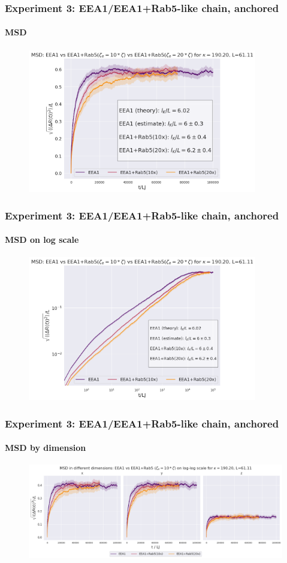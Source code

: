 \documentclass[handout]{beamer}
\begin{document}
\begin{frame}
    \frametitle{Experiment 3: EEA1/EEA1+Rab5-like chain, anchored}
    \framesubtitle{MSD}
    \framesubtitle{}
    \begin{figure}[h]
        \includegraphics[width=10cm]{./14+15+16-exp-msd.png}
    \end{figure}
\end{frame}

\begin{frame}
    \frametitle{Experiment 3: EEA1/EEA1+Rab5-like chain, anchored}
    \framesubtitle{MSD on log scale}
    \begin{figure}[h]
        \includegraphics[width=10cm]{./14+15+16-exp-msd-log.png}
    \end{figure}
\end{frame}

\begin{frame}
    \frametitle{Experiment 3: EEA1/EEA1+Rab5-like chain, anchored}
    \framesubtitle{MSD by dimension}
    \begin{figure}[h]
        \includegraphics[width=11.2cm]{./14+15+16-exp-msd-dim.png}
    \end{figure}
\end{frame}
\end{document}
